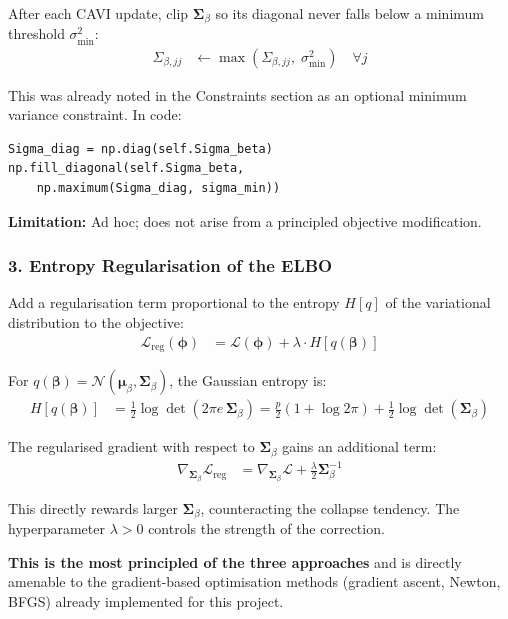 \documentclass[11pt]{article}
\begin{document}
After each CAVI update, clip $\bm{\Sigma}_\beta$ so its diagonal never falls below a minimum threshold $\sigma^2_{\min}$:
\begin{align}
  \Sigma_{\beta,jj} &\leftarrow \max\!\left(\Sigma_{\beta,jj},\; \sigma^2_{\min}\right) \quad \forall j
\end{align}

This was already noted in the Constraints section as an optional minimum variance constraint. In code:
\begin{verbatim}
Sigma_diag = np.diag(self.Sigma_beta)
np.fill_diagonal(self.Sigma_beta,
    np.maximum(Sigma_diag, sigma_min))
\end{verbatim}

\textbf{Limitation:} Ad hoc; does not arise from a principled objective modification.

\subsubsection*{3. Entropy Regularisation of the ELBO}

Add a regularisation term proportional to the entropy $H[q]$ of the variational distribution to the objective:
\begin{align}
  \mathcal{L}_{\text{reg}}(\bm{\phi}) &= \mathcal{L}(\bm{\phi}) + \lambda \cdot H[q(\bm{\beta})]
\end{align}

For $q(\bm{\beta}) = \mathcal{N}(\bm{\mu}_\beta, \bm{\Sigma}_\beta)$, the Gaussian entropy is:
\begin{align}
  H[q(\bm{\beta})] &= \frac{1}{2} \log \det(2\pi e\, \bm{\Sigma}_\beta)
               = \frac{p}{2}(1 + \log 2\pi) + \frac{1}{2}\log\det(\bm{\Sigma}_\beta)
\end{align}

The regularised gradient with respect to $\bm{\Sigma}_\beta$ gains an additional term:
\begin{align}
  \nabla_{\bm{\Sigma}_\beta} \mathcal{L}_{\text{reg}} &= \nabla_{\bm{\Sigma}_\beta} \mathcal{L} + \frac{\lambda}{2} \bm{\Sigma}_\beta^{-1}
\end{align}

This directly rewards larger $\bm{\Sigma}_\beta$, counteracting the collapse tendency. The hyperparameter $\lambda > 0$ controls the strength of the correction.

\textbf{This is the most principled of the three approaches} and is directly amenable to the gradient-based optimisation methods (gradient ascent, Newton, BFGS) already implemented for this project.
\end{document}
